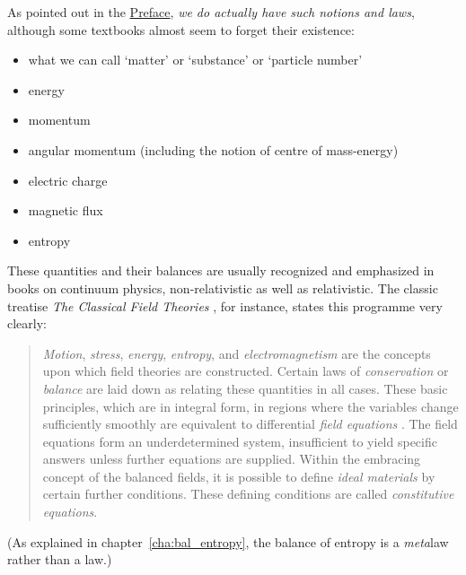 \documentclass[a4paper,12pt,%
onecolumn,oneside,%
british%
]{memoir}
\renewcommand*{\|}[1][]{\nonscript\:#1\vert\nonscript\:\mathopen{}}
\newcommand*{\chap}{chapter}%
\newcommand*{\masse}{mass-energy}
\begin{document}
As pointed out in the \hyperref[cha:preface]{Preface}, \emph{we do actually have such notions and laws}, although some textbooks almost seem to forget their existence:
\begin{itemize}[nosep]
\item what we can call \enquote*{matter} or \enquote*{substance} or \enquote*{particle number}
\item energy
\item momentum
\item angular momentum (including the notion of centre of \masse)
\item electric charge
\item magnetic flux
\item entropy
\end{itemize}
These quantities and their balances are usually recognized and emphasized in books on continuum physics, non-relativistic as well as relativistic. The classic treatise \emph{The Classical Field Theories} \parencites*{truesdelletal1960}, for instance, states this programme very clearly:
\begin{quote}
  \emph{Motion}, \emph{stress}, \emph{energy}, \emph{entropy}, and \emph{electromagnetism} are the concepts upon which field theories are constructed. Certain laws of \emph{conservation} or \emph{balance} are laid down as relating these quantities in all cases. These basic principles, which are in integral form, in regions where the variables change sufficiently smoothly are equivalent to differential \emph{field equations} \textelp{}. The field equations \textelp{} form an underdetermined system, insufficient to yield specific answers unless further equations are supplied. Within the embracing concept of the balanced fields, it is possible to define \emph{ideal materials} by certain further conditions. These defining conditions are called \emph{constitutive equations}.
\end{quote}
(As explained in \chap~\ref{cha:bal_entropy}, the balance of entropy is a \emph{meta}law rather than a law.)

\medskip
\end{document}
